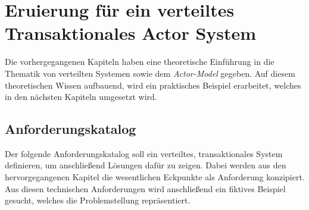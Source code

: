 \chapter{Eruierung für ein verteiltes Transaktionales Actor System} 
\label{cha:Eruierung}
Die vorhergegangenen Kapiteln haben eine theoretische Einführung in die Thematik von verteilten Systemen sowie dem \textit{Actor-Model} gegeben. Auf diesem theoretischen Wissen aufbauend, wird ein praktisches Beispiel erarbeitet, welches in den nächsten Kapiteln umgesetzt wird. 

\section{Anforderungskatalog} \label{sec:Eruierung:technicalRequierements}
Der folgende Anforderungskatalog soll ein verteiltes, transaktionales System definieren, um anschließend Lösungen dafür zu zeigen. Dabei werden aus den hervorgegangenen Kapitel die wesentlichen Eckpunkte als Anforderung konzipiert. Aus diesen technischen Anforderungen wird anschließend ein fiktives Beispiel gesucht, welches die Problemstellung repräsentiert.

